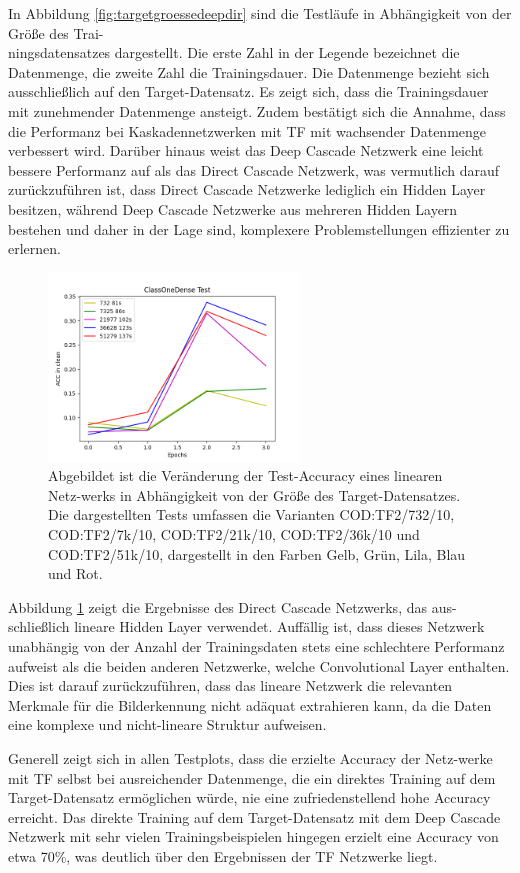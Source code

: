 In Abbildung \ref{fig:targetgroessedeepdir} sind die Testläufe in Abhängigkeit von der Größe des Trai-\\ningsdatensatzes dargestellt. Die erste 
Zahl in der Legende bezeichnet die Datenmenge, die zweite Zahl die Trainingsdauer. Die Datenmenge bezieht sich ausschließlich auf den 
Target-Datensatz. Es zeigt sich, dass die Trainingsdauer mit zunehmender Datenmenge ansteigt. Zudem bestätigt sich die Annahme, dass die 
Performanz bei Kaskadennetzwerken mit TF mit wachsender Datenmenge verbessert wird. Darüber hinaus weist das Deep Cascade 
Netzwerk eine leicht bessere Performanz auf als das Direct Cascade Netzwerk, was vermutlich darauf zurückzuführen ist, dass Direct Cascade 
Netzwerke lediglich ein Hidden Layer besitzen, während Deep Cascade Netzwerke aus mehreren Hidden Layern bestehen und daher in der Lage sind, 
komplexere Problemstellungen effizienter zu erlernen. 

\begin{figure}[htpb]
    \centering
    \includegraphics[height=5cm]{../../Plots/ba_plots/targetgroesse/cod_ts.png}
    \caption{\label{fig:targetgroesselinear} 
    \small{Abgebildet ist die Veränderung der Test-Accuracy eines linearen Netz-werks in Abhängigkeit von der Größe des Target-Datensatzes. 
    Die dargestellten Tests umfassen die Varianten COD:TF2/732/10, COD:TF2/7k/10, COD:TF2/21k/10, COD:TF2/36k/10 und COD:TF2/51k/10, 
    dargestellt in den Farben Gelb, Grün, Lila, Blau und Rot.}}
\end{figure}

Abbildung \ref{fig:targetgroesselinear} zeigt die Ergebnisse des Direct Cascade Netzwerks, das aus-schließlich lineare Hidden Layer verwendet. 
Auffällig ist, dass dieses Netzwerk unabhängig von der Anzahl der Trainingsdaten stets eine schlechtere Performanz aufweist als die beiden 
anderen Netzwerke, welche Convolutional Layer enthalten. Dies ist darauf zurückzuführen, dass das lineare Netzwerk die relevanten Merkmale für 
die Bilderkennung nicht adäquat extrahieren kann, da die Daten eine komplexe und nicht-lineare Struktur aufweisen.

Generell zeigt sich in allen Testplots, dass die erzielte Accuracy der Netz-werke mit TF selbst bei ausreichender Datenmenge, die ein direktes 
Training auf dem 
Target-Datensatz ermöglichen würde, nie eine zufriedenstellend hohe Accuracy erreicht. Das direkte Training auf dem Target-Datensatz mit dem 
Deep Cascade Netzwerk mit sehr vielen Trainingsbeispielen hingegen erzielt eine Accuracy von etwa 70\%, was deutlich über den Ergebnissen der 
TF Netzwerke liegt.
